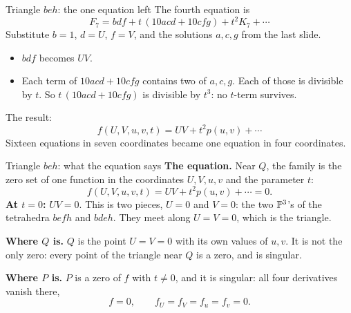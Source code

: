 \begin{frame}{Triangle \(beh\): the one equation left}
The fourth equation is
\[
F_7=bdf+t\,(10acd+10cfg)+t^2K_7+\cdots
\]
Substitute \(b=1\), \(d=U\), \(f=V\), and the solutions \(a,c,g\) from the last slide.
\begin{itemize}
\setlength{\itemsep}{8pt}
\item \(bdf\) becomes \(UV\).
\item Each term of \(10acd+10cfg\) contains two of \(a,c,g\). Each of those is divisible by \(t\). So \(t\,(10acd+10cfg)\) is divisible by \(t^3\): no \(t\)-term survives.
\end{itemize}
The result:
\[
\boxed{f(U,V,u,v,t)=UV+t^2p(u,v)+\cdots}
\]
Sixteen equations in seven coordinates became one equation in four coordinates.
\end{frame}
\begin{frame}{Triangle \(beh\): what the equation says}
\textbf{The equation.} Near \(Q\), the family is the zero set of one function in the coordinates \(U,V,u,v\) and the parameter \(t\):
\[
\boxed{f(U,V,u,v,t)=UV+t^2p(u,v)+\cdots=0.}
\]
\textbf{At \(t=0\):} \(UV=0\). This is two pieces, \(U=0\) and \(V=0\): the two \(\mathbb P^3\)'s of the tetrahedra \(befh\) and \(bdeh\). They meet along \(U=V=0\), which is the triangle.
\par\medskip
\textbf{Where \(Q\) is.} \(Q\) is the point \(U=V=0\) with its own values of \(u,v\). It is not the only zero: every point of the triangle near \(Q\) is a zero, and is singular.
\par\medskip
\textbf{Where \(P\) is.} \(P\) is a zero of \(f\) with \(t\ne0\), and it is singular: all four derivatives vanish there,
\[
f=0,\qquad f_U=f_V=f_u=f_v=0.
\]
\end{frame}
